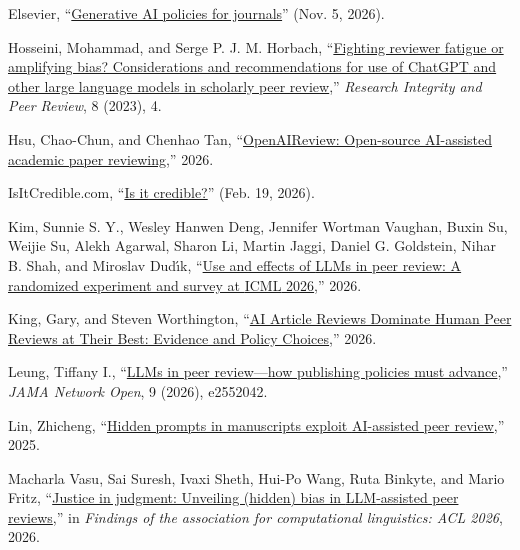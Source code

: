 \documentclass[
  11pt,
  letterpaper,
]{article}
\newlength{\cslhangindent}
\newenvironment{CSLReferences}[2] %
 {\begin{list}{}{%
  \setlength{\itemindent}{0pt}
  \setlength{\leftmargin}{0pt}
  \setlength{\parsep}{0pt}
  \ifodd #1
   \setlength{\leftmargin}{\cslhangindent}
   \setlength{\itemindent}{-1\cslhangindent}
  \fi
  \setlength{\itemsep}{#2\baselineskip}}}
 {\end{list}}
\begin{document}
\begin{CSLReferences}{1}{0}
Elsevier,
{``\href{https://www.elsevier.com/about/policies-and-standards/generative-ai-policies-for-journals}{Generative
AI policies for journals}''} (Nov. 5, 2026).

Hosseini, Mohammad, and Serge P. J. M. Horbach,
{``\href{https://doi.org/10.1186/s41073-023-00133-5}{Fighting reviewer
fatigue or amplifying bias? Considerations and recommendations for use
of {ChatGPT} and other large language models in scholarly peer
review},''} \emph{Research Integrity and Peer Review}, 8 (2023), 4.

Hsu, Chao-Chun, and Chenhao Tan,
{``\href{https://openaireview.github.io/blog.html}{OpenAIReview:
Open-source AI-assisted academic paper reviewing},''} 2026.

IsItCredible.com, {``\href{https://www.isitcredible.com/}{Is it
credible?}''} (Feb. 19, 2026).

Kim, Sunnie S. Y., Wesley Hanwen Deng, Jennifer Wortman Vaughan, Buxin
Su, Weijie Su, Alekh Agarwal, Sharon Li, Martin Jaggi, Daniel G.
Goldstein, Nihar B. Shah, and Miroslav Dudı́k,
{``\href{https://doi.org/10.48550/arXiv.2609.19420}{Use and effects of
{LLMs} in peer review: A randomized experiment and survey at {ICML}
2026},''} 2026.

King, Gary, and Steven Worthington,
{``\href{https://gking.harvard.edu/files/peerless.pdf}{{AI Article
Reviews Dominate Human Peer Reviews at Their Best: Evidence and Policy
Choices}},''} 2026.

Leung, Tiffany I.,
{``\href{https://doi.org/10.1001/jamanetworkopen.2025.52042}{LLMs in
peer review---how publishing policies must advance},''} \emph{JAMA
Network Open}, 9 (2026), e2552042.

Lin, Zhicheng,
{``\href{https://doi.org/10.48550/arXiv.2507.06185}{Hidden prompts in
manuscripts exploit {AI}-assisted peer review},''} 2025.

Macharla Vasu, Sai Suresh, Ivaxi Sheth, Hui-Po Wang, Ruta Binkyte, and
Mario Fritz,
{``\href{https://aclanthology.org/2026.findings-acl.14/}{Justice in
judgment: Unveiling (hidden) bias in {LLM}-assisted peer reviews},''} in
\emph{Findings of the association for computational linguistics: ACL
2026}, 2026.


\end{CSLReferences}
\end{document}
